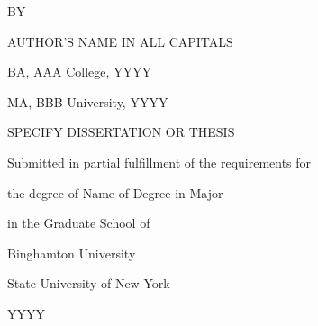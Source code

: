 
\thispagestyle{empty}
\mbox{}
\vspace*{1in}

\begin{doublespace}
\hfill{}\hfill{}
\end{doublespace}

\vfill

\centerline{BY}
\vspace*{2.0\baselineskip}
\centerline{\MakeUppercase{Author's name in all capitals}}
\vspace*{2.0\baselineskip}
\centerline{BA, AAA College, YYYY}
\centerline{MA, BBB University, YYYY}

\vfill

\centerline{\MakeUppercase{Specify dissertation or thesis}}
\vspace*{2.0\baselineskip}
\centerline{Submitted in partial fulfillment of the requirements for}
\centerline{the degree of {Name of Degree} in {Major}}
\centerline{in the Graduate School of}
\centerline{Binghamton University}
\centerline{State University of New York}
\centerline{YYYY}
